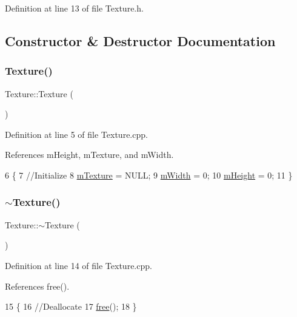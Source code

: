 Definition at line 13 of file Texture.\+h.



\subsection{Constructor \& Destructor Documentation}
\mbox{\label{class_texture_a6c275e3f186675ff6ed73ccf970e552f}} 
\subsubsection{\texorpdfstring{Texture()}{Texture()}}
{\footnotesize\ttfamily Texture\+::\+Texture (\begin{DoxyParamCaption}{ }\end{DoxyParamCaption})}



Definition at line 5 of file Texture.\+cpp.



References m\+Height, m\+Texture, and m\+Width.


\begin{DoxyCode}
6 \{
7     \textcolor{comment}{//Initialize}
8     \hyperlink{class_texture_a28e61626f21dd1c69968e53687a13424}{mTexture} = NULL;
9     \hyperlink{class_texture_a0e007f4b4f1a314e5b0dae1402a13afb}{mWidth} = 0;
10     \hyperlink{class_texture_ad7078e03c0ef6e69b733eb85fd72aec2}{mHeight} = 0;
11 \}
\end{DoxyCode}
\mbox{\label{class_texture_a09c4bcb7462f64c1d20fa69dba3cee8a}} 
\subsubsection{\texorpdfstring{$\sim$\+Texture()}{~Texture()}}
{\footnotesize\ttfamily Texture\+::$\sim$\+Texture (\begin{DoxyParamCaption}{ }\end{DoxyParamCaption})}



Definition at line 14 of file Texture.\+cpp.



References free().


\begin{DoxyCode}
15 \{
16     \textcolor{comment}{//Deallocate}
17     \hyperlink{class_texture_a46d06aec832e5a954f1c8ca957c2c6e5}{free}();
18 \}
\end{DoxyCode}


